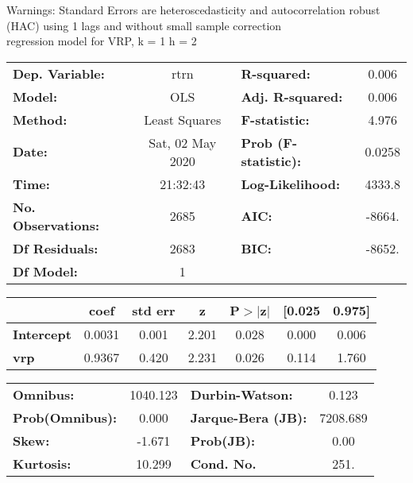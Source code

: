 Warnings: \newline
 [1] Standard Errors are heteroscedasticity and autocorrelation robust (HAC) using 1 lags and without small sample correction\\ 

regression model for VRP, k = 1 h = 2\begin{center}
\begin{tabular}{lclc}
\toprule
\textbf{Dep. Variable:}    &       rtrn       & \textbf{  R-squared:         } &     0.006   \\
\textbf{Model:}            &       OLS        & \textbf{  Adj. R-squared:    } &     0.006   \\
\textbf{Method:}           &  Least Squares   & \textbf{  F-statistic:       } &     4.976   \\
\textbf{Date:}             & Sat, 02 May 2020 & \textbf{  Prob (F-statistic):} &   0.0258    \\
\textbf{Time:}             &     21:32:43     & \textbf{  Log-Likelihood:    } &    4333.8   \\
\textbf{No. Observations:} &        2685      & \textbf{  AIC:               } &    -8664.   \\
\textbf{Df Residuals:}     &        2683      & \textbf{  BIC:               } &    -8652.   \\
\textbf{Df Model:}         &           1      & \textbf{                     } &             \\
\bottomrule
\end{tabular}
\begin{tabular}{lcccccc}
                   & \textbf{coef} & \textbf{std err} & \textbf{z} & \textbf{P$> |$z$|$} & \textbf{[0.025} & \textbf{0.975]}  \\
\midrule
\textbf{Intercept} &       0.0031  &        0.001     &     2.201  &         0.028        &        0.000    &        0.006     \\
\textbf{vrp}       &       0.9367  &        0.420     &     2.231  &         0.026        &        0.114    &        1.760     \\
\bottomrule
\end{tabular}
\begin{tabular}{lclc}
\textbf{Omnibus:}       & 1040.123 & \textbf{  Durbin-Watson:     } &    0.123  \\
\textbf{Prob(Omnibus):} &   0.000  & \textbf{  Jarque-Bera (JB):  } & 7208.689  \\
\textbf{Skew:}          &  -1.671  & \textbf{  Prob(JB):          } &     0.00  \\
\textbf{Kurtosis:}      &  10.299  & \textbf{  Cond. No.          } &     251.  \\
\bottomrule
\end{tabular}
\end{center}


